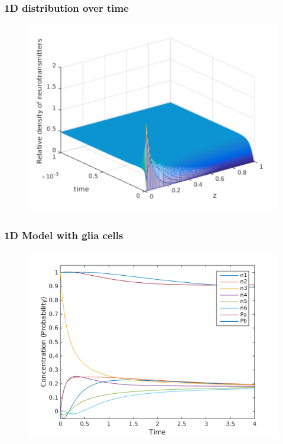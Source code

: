 \documentclass[screen]{beamer}
\begin{document}
\begin{frame}
  \frametitle{1D distribution over time}
	
   \begin{figure}
   \includegraphics[scale=0.6]{1dmodel_plot-crop}
  \end{figure}
  
\end{frame}



\begin{frame}
	\frametitle{1D Model with glia cells}
	\begin{figure}
	\includegraphics[scale=0.6]{1dodeLabels}
	\end{figure}
\end{frame}
\end{document}
